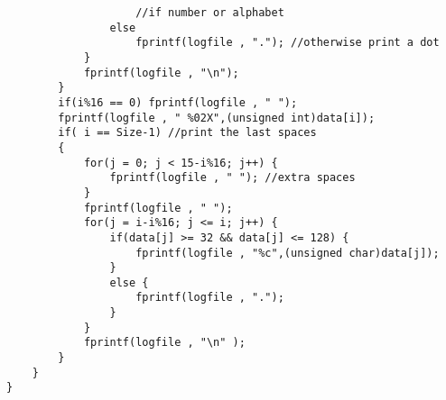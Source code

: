 \begin{verbatim}
                    //if number or alphabet
                else
                    fprintf(logfile , "."); //otherwise print a dot
            }
            fprintf(logfile , "\n");
        }
        if(i%16 == 0) fprintf(logfile , " ");
        fprintf(logfile , " %02X",(unsigned int)data[i]);
        if( i == Size-1) //print the last spaces
        {
            for(j = 0; j < 15-i%16; j++) {
                fprintf(logfile , " "); //extra spaces
            }
            fprintf(logfile , " ");
            for(j = i-i%16; j <= i; j++) {
                if(data[j] >= 32 && data[j] <= 128) {
                    fprintf(logfile , "%c",(unsigned char)data[j]);
                }
                else {
                    fprintf(logfile , ".");
                }
            }
            fprintf(logfile , "\n" );
        }
    }
}
\end{verbatim}
\normalsize
